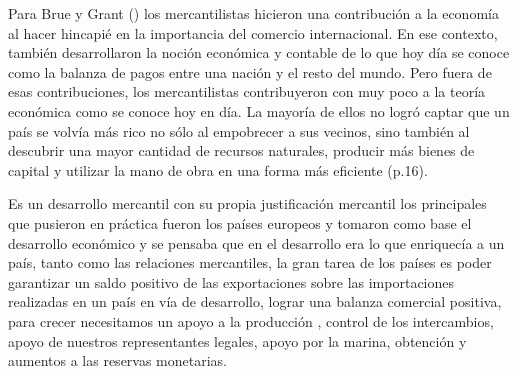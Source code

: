 \documentclass[
  stu,
  floatsintext,
  longtable,
  a4paper,
  nolmodern,
  notxfonts,
  notimes,
  12pt,
  colorlinks=true,linkcolor=blue,citecolor=blue,urlcolor=blue]{apa7}
\begin{document}
Para Brue y Grant
() los
mercantilistas hicieron una contribución a la economía al hacer hincapié
en la importancia del comercio internacional. En ese contexto, también
desarrollaron la noción económica y contable de lo que hoy día se conoce
como la balanza de pagos entre una nación y el resto del mundo. Pero
fuera de esas contribuciones, los mercantilistas contribuyeron con muy
poco a la teoría económica como se conoce hoy en día. La mayoría de
ellos no logró captar que un país se volvía más rico no sólo al
empobrecer a sus vecinos, sino también al descubrir una mayor cantidad
de recursos naturales, producir más bienes de capital y utilizar la mano
de obra en una forma más eficiente (p.16).

Es un desarrollo mercantil con su propia justificación mercantil los
principales que pusieron en práctica fueron los países europeos y
tomaron como base el desarrollo económico y se pensaba que en el
desarrollo era lo que enriquecía a un país, tanto como las relaciones
mercantiles, la gran tarea de los países es poder garantizar un saldo
positivo de las exportaciones sobre las importaciones realizadas en un
país en vía de desarrollo, lograr una balanza comercial positiva, para
crecer necesitamos un apoyo a la producción , control de los
intercambios, apoyo de nuestros representantes legales, apoyo por la
marina, obtención y aumentos a las reservas monetarias.
\end{document}
